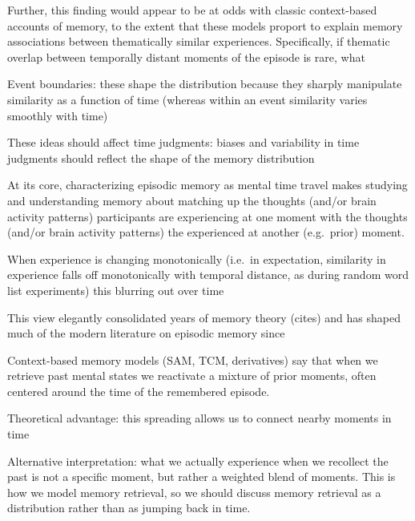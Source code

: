 Further, this finding would appear to be at odds with classic context-based accounts of memory, to the extent that these models proport to explain memory associations between thematically similar experiences.  Specifically, if thematic overlap between temporally distant moments of the episode is rare, what 


\item Event boundaries: these shape the distribution because they sharply manipulate similarity as a function of time (whereas within an event similarity varies smoothly with time)
\item These ideas should affect time judgments: biases and variability in time judgments should reflect the shape of the memory distribution


At its core, characterizing episodic memory as mental time travel makes studying and understanding memory about matching up the thoughts (and/or brain activity patterns) participants are experiencing at one moment with the thoughts (and/or brain activity patterns) the experienced at another (e.g.\ prior) moment.

When experience is changing monotonically (i.e.\ in expectation, similarity in experience falls off monotonically with temporal distance, as during random word list experiments) this blurring out over time 

\item This view elegantly consolidated years of memory theory (cites) and has shaped much of the modern literature on episodic memory since
\item Context-based memory models (SAM, TCM, derivatives) say that when we retrieve past mental states we reactivate a mixture of prior moments, often centered around the time of the remembered episode.
\item Theoretical advantage: this spreading allows us to connect nearby moments in time
\item Alternative interpretation: what we actually experience when we recollect the past is  not a specific moment, but rather a weighted blend of moments.  This is how we model memory retrieval, so we should discuss memory retrieval as a distribution rather than as jumping back in time.